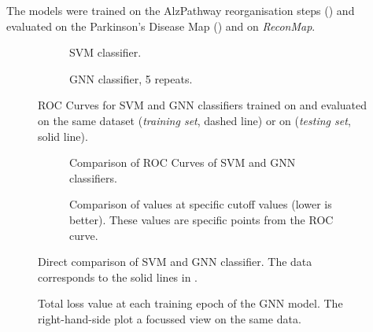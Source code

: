 \documentclass[
	fontsize=10pt, %
	twoside=false, %
	secnumdepth=1, %
  toc=indentunnumbered %
]{kaobook}
\begin{document}
The models were trained on the AlzPathway reorganisation steps (\ADMap)
and evaluated on the Parkinson's Disease Map (\PDMap) and on \textit{ReconMap}.

\begin{figure}[h]
  \centering
  \begin{subfigure}[h]{0.49\linewidth}
    \caption{SVM classifier.}
  \end{subfigure}
  \begin{subfigure}[h]{0.49\linewidth}
    \caption{GNN classifier, 5 repeats.  }
  \end{subfigure}
  \caption{ROC Curves for SVM and GNN classifiers trained on \ADMap
    and evaluated on the same dataset (\textit{training set}, dashed line) or on \PDMap
    (\textit{testing set}, solid line).}
  \label{fig:svm-repro-comparison}
\end{figure}
%
\begin{figure}[h]
  \centering
  \begin{subfigure}[h]{0.49\linewidth}
    \caption{Comparison of ROC Curves of SVM and GNN classifiers.}
  \end{subfigure}
  \begin{subfigure}[h]{0.49\linewidth}
    \caption{Comparison of \FPR values at specific \TPR cutoff values (lower is better). These
      values are specific points from the ROC curve.}
  \end{subfigure}
  \caption{Direct comparison of SVM and GNN classifier. The data
    corresponds to the solid lines in .}
  \label{fig:svm-repro-roc-train-test}
\end{figure}


\begin{figure}[h]
  \centering
  \begin{subfigure}[h]{0.49\linewidth}
  \end{subfigure}
  \begin{subfigure}[h]{0.49\linewidth}
  \end{subfigure}
  \caption{Total loss value at each training epoch of the GNN model. The right-hand-side plot a
    focussed view on the same data.}
  \label{fig:svm-repro-loss}
\end{figure}
\end{document}
